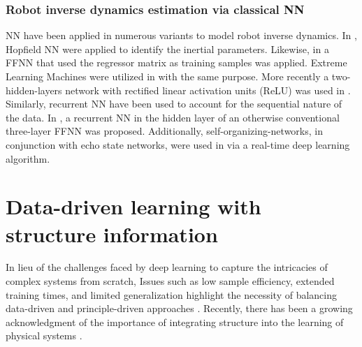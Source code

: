 \subsubsection{Robot inverse dynamics estimation via classical NN}\label{sec:classic_inv_dyn}
NN have been applied in numerous variants to model robot inverse dynamics. In \cite{Atencia2015Hopfieldnetworksoptimization}, Hopfield NN were applied to identify the inertial parameters. Likewise, in \cite{Zhu2014Inertiaparameteridentification} a FFNN that used the regressor matrix as training samples was applied. Extreme Learning Machines were utilized in \cite{Bargsten2016ExperimentalRobotInverse} with the same purpose. More recently a two-hidden-layers network with rectified linear activation units (ReLU) was used in \cite{Christiano2016TransferSimulationReal}. Similarly, recurrent NN have been used to account for the sequential nature of the data. In \cite{Yan1997Robotlearningcontrol}, a recurrent NN in the hidden layer of an otherwise conventional three-layer FFNN was proposed. Additionally, self-organizing-networks, in conjunction with echo state networks, were used in \cite{Polydoros2015Realtimedeep} via a real-time deep learning algorithm.
\section{Data-driven learning with structure information}
In lieu of the challenges faced by deep learning to capture the intricacies of complex systems from scratch,  
Issues such as low sample efficiency, extended training times, and limited generalization highlight the necessity of balancing data-driven and principle-driven approaches \cite{Pierson2017Deeplearningrobotics,Suenderhauf2018limitspotentialsdeep}. Recently, there has been a growing acknowledgment of the importance of integrating structure into the learning of physical systems \cite{Geist2021Structuredlearningrigid,Lutter2023Combiningphysicsdeep}.

